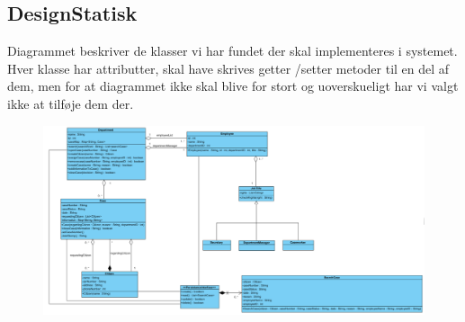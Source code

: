 \subsection{DesignStatisk}
Diagrammet beskriver de klasser vi har fundet der skal implementeres i systemet. Hver klasse har attributter, skal have skrives getter /setter metoder til en del af dem, men for at diagrammet ikke skal blive for stort og uoverskueligt har vi valgt ikke at tilføje dem der.\\
\begin{figure}[h]
\includegraphics[width = \linewidth]{./PNG/designklassediagram.PNG}
\end{figure}